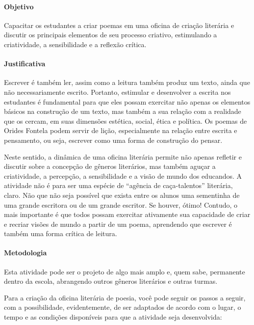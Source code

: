\documentclass[12pt]{extarticle}
\begin{document}
\paragraph{Objetivo} Capacitar os estudantes a criar poemas em uma oficina
de criação literária e discutir os principais elementos de seu processo
criativo, estimulando a criatividade, a sensibilidade e a reflexão
crítica.

\paragraph{Justificativa} Escrever é também ler, assim como a leitura
também produz um texto, ainda que não necessariamente escrito. Portanto,
estimular e desenvolver a escrita nos estudantes é fundamental para que
eles possam exercitar não apenas os elementos básicos na construção de
um texto, mas também a sua relação com a realidade que os cercam, em
suas dimensões estética, social, ética e política. Os poemas de Orides
Fontela podem servir de lição, especialmente na relação entre escrita e
pensamento, ou seja, escrever como uma forma de construção do pensar.

Neste sentido, a dinâmica de uma oficina literária permite não apenas
refletir e discutir sobre a concepção de gêneros literários, mas também
aguçar a criatividade, a percepção, a sensibilidade e a visão de mundo
dos educandos. A atividade não é para ser uma espécie de ``agência de
caça-talentos'' literária, claro. Não que não seja possível que exista
entre os alunos uma sementinha de uma grande escritora ou de um grande
escritor. Se houver, ótimo! Contudo, o mais importante é que todos
possam exercitar ativamente sua capacidade de criar e recriar visões de
mundo a partir de um poema, aprendendo que escrever é também uma forma
crítica de leitura.

\paragraph{Metodologia} Esta atividade pode ser o projeto de algo mais
amplo e, quem sabe, permanente dentro da escola, abrangendo outros
gêneros literários e outras turmas.

Para a criação da oficina literária de poesia, você pode seguir os
passos a seguir, com a possibilidade, evidentemente, de ser adaptados de
acordo com o lugar, o tempo e as condições disponíveis para que a
atividade seja desenvolvida:
\end{document}
